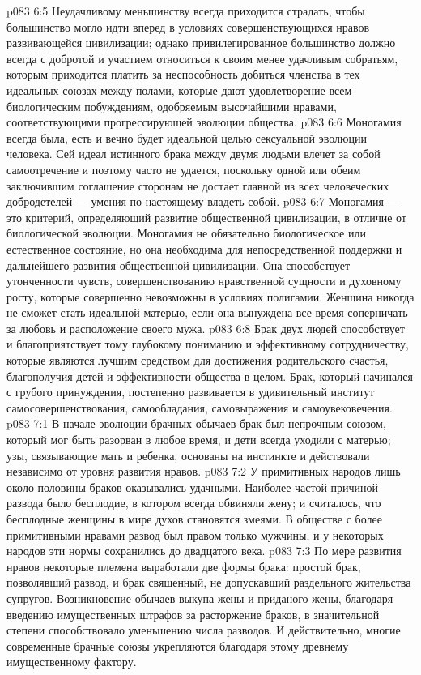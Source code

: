 \vs p083 6:5 Неудачливому меньшинству всегда приходится страдать, чтобы большинство могло идти вперед в условиях совершенствующихся нравов развивающейся цивилизации; однако привилегированное большинство должно всегда с добротой и участием относиться к своим менее удачливым собратьям, которым приходится платить за неспособность добиться членства в тех идеальных союзах между полами, которые дают удовлетворение всем биологическим побуждениям, одобряемым высочайшими нравами, соответствующими прогрессирующей эволюции общества.
\vs p083 6:6 \pc Моногамия всегда была, есть и вечно будет идеальной целью сексуальной эволюции человека. Сей идеал истинного брака между двумя людьми влечет за собой самоотречение и поэтому часто не удается, поскольку одной или обеим заключившим соглашение сторонам не достает главной из всех человеческих добродетелей --- умения по\hyp{}настоящему владеть собой.
\vs p083 6:7 Моногамия --- это критерий, определяющий развитие общественной цивилизации, в отличие от биологической эволюции. Моногамия не обязательно биологическое или естественное состояние, но она необходима для непосредственной поддержки и дальнейшего развития общественной цивилизации. Она способствует утонченности чувств, совершенствованию нравственной сущности и духовному росту, которые совершенно невозможны в условиях полигамии. Женщина никогда не сможет стать идеальной матерью, если она вынуждена все время соперничать за любовь и расположение своего мужа.
\vs p083 6:8 Брак двух людей способствует и благоприятствует тому глубокому пониманию и эффективному сотрудничеству, которые являются лучшим средством для достижения родительского счастья, благополучия детей и эффективности общества в целом. Брак, который начинался с грубого принуждения, постепенно развивается в удивительный институт самосовершенствования, самообладания, самовыражения и самоувековечения.
\vs p083 7:1 В начале эволюции брачных обычаев брак был непрочным союзом, который мог быть разорван в любое время, и дети всегда уходили с матерью; узы, связывающие мать и ребенка, основаны на инстинкте и действовали независимо от уровня развития нравов.
\vs p083 7:2 У примитивных народов лишь около половины браков оказывались удачными. Наиболее частой причиной развода было бесплодие, в котором всегда обвиняли жену; и считалось, что бесплодные женщины в мире духов становятся змеями. В обществе с более примитивными нравами развод был правом только мужчины, и у некоторых народов эти нормы сохранились до двадцатого века.
\vs p083 7:3 По мере развития нравов некоторые племена выработали две формы брака: простой брак, позволявший развод, и брак священный, не допускавший раздельного жительства супругов. Возникновение обычаев выкупа жены и приданого жены, благодаря введению имущественных штрафов за расторжение браков, в значительной степени способствовало уменьшению числа разводов. И действительно, многие современные брачные союзы укрепляются благодаря этому древнему имущественному фактору.

